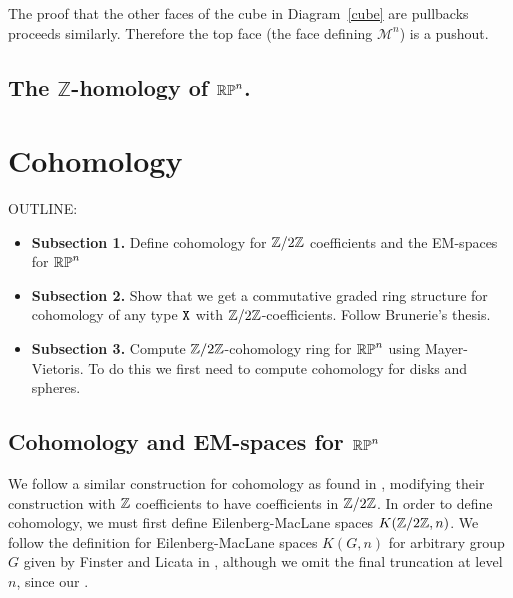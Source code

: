 \documentclass{amsart}
\begin{document}
The proof that the other faces of the cube in Diagram~\ref{cube} are pullbacks proceeds similarly. Therefore the top face (the face defining $\mathcal{M}^n$) is a pushout. 



\subsection{The $\mathbb{Z}$-homology of $\mathbb{RP}^n$.}


\section{Cohomology}
\label{sec:cohom}

OUTLINE:
\begin{itemize}
\item 
  \textbf{Subsection 1.} 
  Define cohomology for $ \mathbb{Z}/2\mathbb{Z} $ coefficients and the
  EM-spaces for $ \mathbb{RP}^n $ 
\item
  \textbf{Subsection 2.} Show that we get a commutative
  graded ring structure for cohomology of any type $ \mathtt{X} $
  with $ \mathbb{Z}/2\mathbb{Z} $-coefficients. Follow Brunerie's thesis.
\item
  \textbf{Subsection 3.} Compute $ \mathbb{Z}/2\mathbb{Z} $-cohomology ring
  for $ \mathbb{RP}^n $ using Mayer-Vietoris.  To do this we 
  first need to compute cohomology for disks and spheres.  
\end{itemize}


\subsection{Cohomology and EM-spaces for $\mathbb{RP}^n$}



We follow a similar construction for cohomology as found in \cite{brunerie:thesis}, modifying their construction with $\mathbb{Z}$ coefficients to have coefficients in $\mathbb{Z}/2\mathbb{Z}$. In order to define cohomology, we must first define Eilenberg-MacLane spaces $K(\mathbb{Z}/2\mathbb{Z},n)$. We follow the definition for Eilenberg-MacLane spaces $K(G,n)$ for arbitrary group $G$ given by Finster and Licata in \cite{fl:em}, although we omit the final truncation at level $n$, since our .
\end{document}
